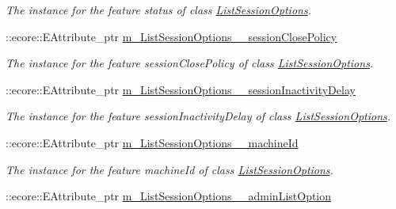 \begin{DoxyCompactItemize}
\begin{DoxyCompactList}\small\item\em The instance for the feature status of class \hyperlink{classUMS__Data_1_1ListSessionOptions}{ListSessionOptions}. \item\end{DoxyCompactList}\item 
\hypertarget{classUMS__Data_1_1UMS__DataPackage_a8105d408470862bfc1a5d94aea85dd96}{
::ecore::EAttribute\_\-ptr \hyperlink{classUMS__Data_1_1UMS__DataPackage_a8105d408470862bfc1a5d94aea85dd96}{m\_\-ListSessionOptions\_\-\_\-sessionClosePolicy}}
\label{classUMS__Data_1_1UMS__DataPackage_a8105d408470862bfc1a5d94aea85dd96}

\begin{DoxyCompactList}\small\item\em The instance for the feature sessionClosePolicy of class \hyperlink{classUMS__Data_1_1ListSessionOptions}{ListSessionOptions}. \item\end{DoxyCompactList}\item 
\hypertarget{classUMS__Data_1_1UMS__DataPackage_a4d021389b1e7a2efb6bfdfe0515f42ce}{
::ecore::EAttribute\_\-ptr \hyperlink{classUMS__Data_1_1UMS__DataPackage_a4d021389b1e7a2efb6bfdfe0515f42ce}{m\_\-ListSessionOptions\_\-\_\-sessionInactivityDelay}}
\label{classUMS__Data_1_1UMS__DataPackage_a4d021389b1e7a2efb6bfdfe0515f42ce}

\begin{DoxyCompactList}\small\item\em The instance for the feature sessionInactivityDelay of class \hyperlink{classUMS__Data_1_1ListSessionOptions}{ListSessionOptions}. \item\end{DoxyCompactList}\item 
\hypertarget{classUMS__Data_1_1UMS__DataPackage_a5c5251564aad10a20628bdd475ad2366}{
::ecore::EAttribute\_\-ptr \hyperlink{classUMS__Data_1_1UMS__DataPackage_a5c5251564aad10a20628bdd475ad2366}{m\_\-ListSessionOptions\_\-\_\-machineId}}
\label{classUMS__Data_1_1UMS__DataPackage_a5c5251564aad10a20628bdd475ad2366}

\begin{DoxyCompactList}\small\item\em The instance for the feature machineId of class \hyperlink{classUMS__Data_1_1ListSessionOptions}{ListSessionOptions}. \item\end{DoxyCompactList}\item 
\hypertarget{classUMS__Data_1_1UMS__DataPackage_a77eb09bc9bfc76b87cd211403dcb7ca2}{
::ecore::EAttribute\_\-ptr \hyperlink{classUMS__Data_1_1UMS__DataPackage_a77eb09bc9bfc76b87cd211403dcb7ca2}{m\_\-ListSessionOptions\_\-\_\-adminListOption}}
\label{classUMS__Data_1_1UMS__DataPackage_a77eb09bc9bfc76b87cd211403dcb7ca2}


\end{DoxyCompactItemize}
